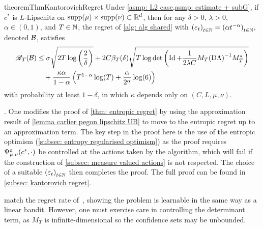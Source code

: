 \begin{restatable}{theorem}{ThmKantorovichRegret}\label{thm: regret Kantorovich}
    Under \cref{asmp: L2 case,asmp: estimate + subG}, if $c^*$ is $L$-Lipschitz on $\text{supp}(\mu)\times\text{supp}(\nu)\subset\mathbb{R}^d$, then for any $\delta>0$, $\lambda>0$, $\alpha\in(0,1)$, and $T\in\mathbb{N}$, the regret of \cref{alg: alg shared} with ${(\varepsilon_t)}_{t\in\mathbb{N}}={(\alpha t^{-\alpha})}_{t\in\mathbb{N}}$, denoted $\mathcal{B}$, satisfies
    \begin{align*}
        \mathscr{R}_T(\mathcal{B}) &\le \sigma\sqrt{2T\log\left(\frac2\delta\right)} + 2C\beta_T(\delta)\sqrt{T\log\det\left(\operatorname{Id} + \frac{1}{2\lambda C}M_T{(\mathrm{D}\Lambda)}^{-1}M_T^*\right)}\\
        &\quad +\frac{\kappa\alpha}{1-\alpha}\left(T^{1-\alpha}\log(T) + \frac{\alpha}{2^\alpha}\log(6)\right)
    \end{align*}
    with probability at least $1-\delta$, in which $\kappa$ depends only on $(C,L,\mu,\nu)$.
\end{restatable}
{
    \flushleft{}. One modifies the proof of \cref{thm: entropic regret} by using the approximation result of \cref{lemma carlier pegon lipschitz UB} to move to the entropic regret up to an approximation term. The key step in the proof here is the use of the entropic optimism (\cref{subsec: entropy regularised optimism}) as the proof requires $\Psi_{\mu,\nu}^\varepsilon(c^*,\cdot)$ be controlled at the actions taken by the algorithm, which will fail if the construction of \cref{subsec: measure valued actions} is not respected. The choice of a suitable ${(\varepsilon_t)}_{t\in\mathbb{N}}$ then completes the proof. The full proof can be found in \cref{subsec: kantorovich regret}. 
}

 match the regret rate of~\cite{abbasi-yadkori_online_2012}, showing the problem is learnable in the same way as a linear bandit. However, one must exercise care in controlling the determinant term, as $M_T$ is infinite-dimensional so the confidence sets may be unbounded. 
